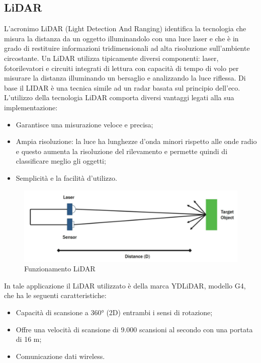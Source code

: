 \subsection{LiDAR}
L’acronimo LiDAR (Light Detection And Ranging) \cite{lidar} \cite{lidar2} identifica la tecnologia che  misura la distanza da un oggetto illuminandolo con una luce laser e che è  in grado di restituire informazioni tridimensionali ad alta risoluzione sull’ambiente circostante. Un LiDAR utilizza tipicamente diversi componenti: laser, fotorilevatori e circuiti integrati di lettura con capacità di tempo di volo per misurare la distanza illuminando un bersaglio e analizzando la luce riflessa.
Di base il LIDAR è una tecnica simile ad un radar basata sul principio dell'eco.\\
L’utilizzo della tecnologia LiDAR comporta diversi vantaggi legati alla sua implementazione:
\begin{itemize}
\item Garantisce una misurazione veloce e precisa;
\item Ampia risoluzione: la luce ha lunghezze d’onda minori rispetto alle onde radio e questo aumenta la risoluzione del rilevamento e permette quindi di classificare meglio gli oggetti;
\item Semplicità e la facilità d’utilizzo.
\end{itemize}

\begin{figure} [H]
    \centering
    \includegraphics[width=0.5\linewidth]{img/Lidar.PNG}
    \caption{Funzionamento LiDAR}
    \label{fig:Lidar}
\end{figure}

In tale applicazione il LiDAR utilizzato è della marca YDLiDAR, modello G4, che ha le seguenti caratteristiche:
\begin{itemize}
\item Capacità di scansione a 360° (2D) entrambi i sensi di rotazione;
\item Offre una velocità di scansione di 9.000 scansioni al secondo con una portata di 16 m;
\item Comunicazione dati wireless.
\end{itemize}





